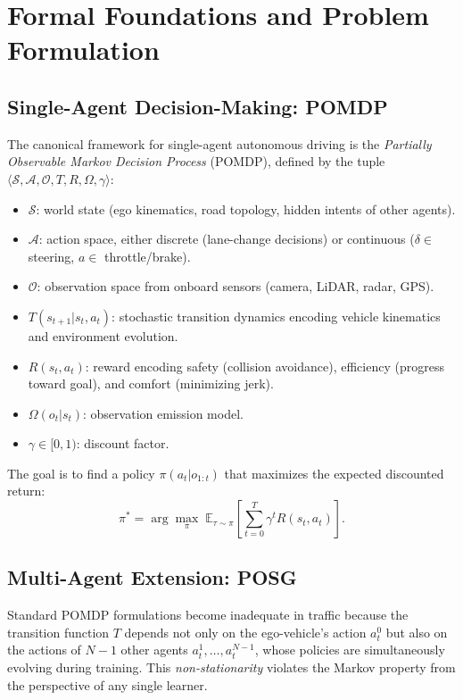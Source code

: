 \documentclass[12pt, a4paper]{article}
\begin{document}
\section{Formal Foundations and Problem Formulation}
\label{sec:background}

\subsection{Single-Agent Decision-Making: POMDP}
The canonical framework for single-agent autonomous driving is the \emph{Partially
Observable Markov Decision Process} (POMDP), defined by the tuple
$\langle \mathcal{S}, \mathcal{A}, \mathcal{O}, T, R, \Omega, \gamma \rangle$:

\begin{itemize}[noitemsep]
  \item $\mathcal{S}$: world state (ego kinematics, road topology, hidden intents
        of other agents).
  \item $\mathcal{A}$: action space, either discrete (lane-change decisions) or
        continuous ($\delta \in$ steering, $a \in$ throttle/brake).
  \item $\mathcal{O}$: observation space from onboard sensors (camera, LiDAR,
        radar, GPS).
  \item $T(s_{t+1} | s_t, a_t)$: stochastic transition dynamics encoding vehicle
        kinematics and environment evolution.
  \item $R(s_t, a_t)$: reward encoding safety (collision avoidance), efficiency
        (progress toward goal), and comfort (minimizing jerk).
  \item $\Omega(o_t | s_t)$: observation emission model.
  \item $\gamma \in [0, 1)$: discount factor.
\end{itemize}

The goal is to find a policy $\pi(a_t | o_{1:t})$ that maximizes the expected
discounted return:
\begin{equation}
  \pi^* = \arg\max_\pi \; \mathbb{E}_{\tau \sim \pi}
          \!\left[ \sum_{t=0}^{T} \gamma^t R(s_t, a_t) \right].
  \label{eq:pomdp}
\end{equation}

\subsection{Multi-Agent Extension: POSG}
Standard POMDP formulations become inadequate in traffic because the transition
function $T$ depends not only on the ego-vehicle's action $a^0_t$ but also on
the actions of $N-1$ other agents $a^1_t, \dots, a^{N-1}_t$, whose policies are
simultaneously evolving during training. This \emph{non-stationarity} violates the
Markov property from the perspective of any single learner.
\end{document}
